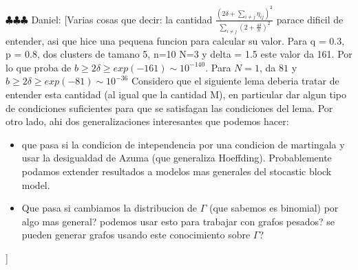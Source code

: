 \documentclass[12pt]{amsart}
\numberwithin{equation}{section}
\newcommand{\ddr}[1]{{\color{blue} \sf $\clubsuit\clubsuit\clubsuit$ Daniel: [#1]}}
\begin{document}
\ddr{Varias cosas que decir: la cantidad $\frac{\left (2\delta + \sum_{i\neq j}\eta_{ij}\right )^2}{\sum_{i\neq j}(2+\frac{4\delta}{n})^2} $
parace dificil de entender, asi que hice una pequena funcion para calcular su valor. Para q = 0.3, p = 0.8, dos clusters de tamano 5, n=10 N=3 y delta = 1.5 este valor da 161. Por lo que proba de $b \geq 2\delta \geq exp(-161) \sim 10^{-140}$. Para $N=1$, da $81$ y $b \geq 2\delta \geq exp(-81) \sim 10^{-36}$ Considero que el siguiente lema deberia tratar de entender esta cantidad (al igual que la cantidad M), en particular dar algun tipo de condiciones suficientes para que se satisfagan las condiciones del lema. Por otro lado, ahi dos generalizaciones interesantes que podemos hacer:
\begin{itemize}
\item que pasa si la condicion de intependencia por una condicion de martingala y usar la desigualdad de Azuma (que generaliza Hoeffding). Probablemente podamos extender resultados a modelos mas generales del stocastic block model.
\item Que pasa si cambiamos la distribucion de $\Gamma$ (que sabemos es binomial) por algo mas general? podemos usar esto para trabajar con grafos pesados? se pueden generar grafos usando este conocimiento sobre $\Gamma$?
\end{itemize}
}
\end{document}
